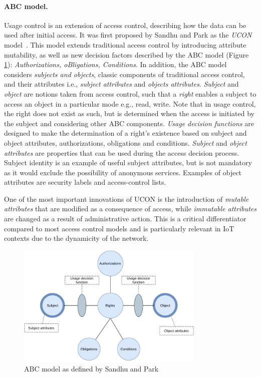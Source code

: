 \paragraph{ABC model.} Usage control is an extension of access control, describing how the data can be used after initial access. It was first proposed by Sandhu and Park as the \emph{UCON} model~\cite{Park2004}. This model extends traditional access control by introducing attribute mutability, as well as new decision factors described by the ABC model (Figure \ref{F_ABC_model}): \emph{Authorizations, oBligations, Conditions}.
In addition, the ABC model considers \emph{subjects and objects}, classic components of traditional access control, and their attributes i.e., \emph{subject attributes} and \emph{objects attributes}. 
\emph{Subject} and \emph{object} are notions taken from access control, such that a \emph{right} enables a subject to access an object in a particular mode e.g., read, write. Note that in usage control, the right does not exist as such, but is determined when the access is initiated by the subject and considering other ABC components. \emph{Usage decision functions} are designed 
to make the determination of a right's existence based on subject and object attributes, authorizations, obligations and conditions.
\emph{Subject} and \emph{object attributes} are properties that can be used during the access decision process. Subject identity is an example of useful subject attributes, but is not mandatory
as it would exclude the possibility of anonymous services. Examples of object attributes are security labels and access-control lists. 

One of the most important innovations of UCON is the introduction of \emph{mutable attributes} that are modified as a consequence of access, while \emph{immutable attributes} are changed as a 
result of administrative action. This is a critical differentiator compared to most access control models and is particularly relevant in IoT contexts due to the dynamicity of the network.
\begin{figure}[t]
\centering
 \includegraphics[width=0.8\textwidth]{Images/abc_model.pdf}
\caption{ABC model as defined by Sandhu and Park \cite{Park2004}}
\label{F_ABC_model}
\end{figure} 

